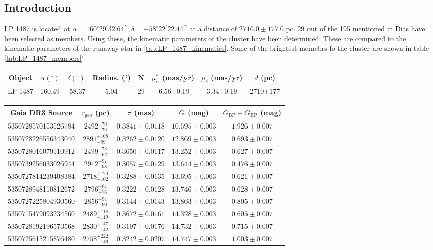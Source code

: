 \subsection{Introduction}
    LP 1487 is located at $\alpha = 160^\circ29{}^\prime32.64{}^{\prime\prime}, \delta = -58^\circ22{}^\prime22.44{}^{\prime\prime}$ at a distance of $2710.0\pm177.0$ pc.
    29 out of the 195 mentioned in Dias have been selected as members. Using these, the kinematic parameters of the cluster have been determined. These are compared to the kinematic parameters of the runaway star in \ref{tab:LP_1487_kinematics}. Some of the brightest memebrs fo the cluster are shown in table \ref{tab:LP_1487_members}' 
    

\begin{table*}[h]
\caption{Kinematic parameters of LP 1487}
\label{tab:LP_1487_kinematics}
\begin{tabular}{cccccccc}
\hline
Object & $\alpha (^\circ)$ & $\delta (^\circ)$ & Radius. (') & N & $\mu_{\alpha}^*$ (mas/yr) & $\mu_{\delta}$ (mas/yr) & $d$ (pc) \\
\hline
LP 1487 & 160.49 & -58.37 & 5.04 & 29 & -6.56$\pm$0.19 & 3.34$\pm$0.19 & 2710$\pm$177 \\
\hline
\end{tabular}
\end{table*}


\begin{table*}[h]
\caption{Selected members of LP 1487}
\label{tab:LP_1487_members}
\begin{tabular}{ccccc}
\hline
Gaia DR3 Source & $r_{\text{geo}}$ (pc) & $\pi$ (mas) & $G$ (mag) & $G_{\text{BP}}-G_{\text{RP}}$ (mag) \\
\hline
5350728570153526784 & $2492^{+76}_{-76}$ & $0.3841\pm0.0118$ & $10.595\pm0.003$ & $1.926\pm0.007$ \\
5350728226556343040 & $2891^{+108}_{-99}$ & $0.3262\pm0.0120$ & $12.869\pm0.003$ & $0.693\pm0.007$ \\
5350728016079110912 & $2499^{+73}_{-62}$ & $0.3650\pm0.0117$ & $13.252\pm0.003$ & $0.627\pm0.007$ \\
5350739256033026944 & $2912^{+97}_{-98}$ & $0.3057\pm0.0129$ & $13.644\pm0.003$ & $0.476\pm0.007$ \\
5350727814239408384 & $2718^{+120}_{-102}$ & $0.3288\pm0.0135$ & $13.695\pm0.003$ & $0.621\pm0.007$ \\
5350728948110812672 & $2796^{+84}_{-76}$ & $0.3222\pm0.0128$ & $13.746\pm0.003$ & $0.628\pm0.007$ \\
5350727225804930560 & $2856^{+94}_{-90}$ & $0.3144\pm0.0143$ & $13.863\pm0.003$ & $0.805\pm0.007$ \\
5350715479093234560 & $2489^{+118}_{-119}$ & $0.3672\pm0.0161$ & $14.328\pm0.003$ & $0.605\pm0.007$ \\
5350728192196573568 & $2830^{+147}_{-142}$ & $0.3197\pm0.0176$ & $14.732\pm0.003$ & $0.715\pm0.007$ \\
5350725615215876480 & $2758^{+222}_{-146}$ & $0.3242\pm0.0207$ & $14.747\pm0.003$ & $1.003\pm0.007$ \\
\hline
\end{tabular}
\end{table*}
